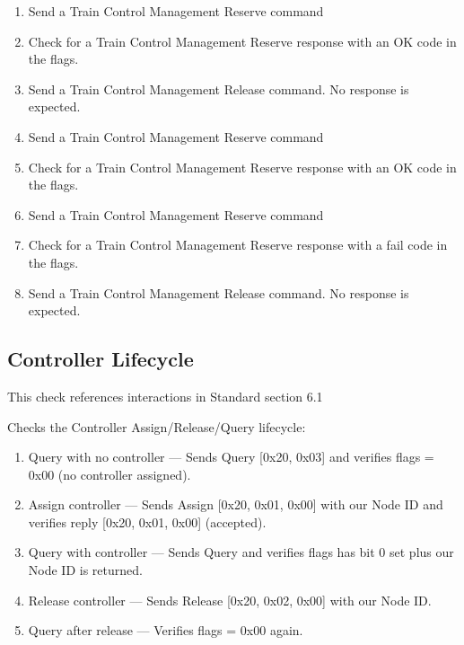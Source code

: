 \begin{enumerate}

    \item Send a Train Control Management Reserve command
    \item Check for a Train Control Management Reserve response with an OK code in the flags.

    \item Send a Train Control Management Release command.  No response is expected.

    \item Send a Train Control Management Reserve command
    \item Check for a Train Control Management Reserve response with an OK code in the flags.

    \item Send a Train Control Management Reserve command
    \item Check for a Train Control Management Reserve response with a fail code in the flags.
    
    \item Send a Train Control Management Release command.  No response is expected.

\end{enumerate}



\subsection {Controller Lifecycle}

This check references interactions in Standard section 6.1

Checks the Controller Assign/Release/Query lifecycle:

\begin{enumerate}

\item Query with no controller — Sends Query [0x20, 0x03] and verifies
flags = 0x00 (no controller assigned).

\item Assign controller — Sends Assign [0x20, 0x01, 0x00] with our Node ID
and verifies reply [0x20, 0x01, 0x00] (accepted).

\item Query with controller — Sends Query and verifies flags has bit 0 set
plus our Node ID is returned.

\item Release controller — Sends Release [0x20, 0x02, 0x00] with our Node ID.

\item Query after release — Verifies flags = 0x00 again.

\end{enumerate}


